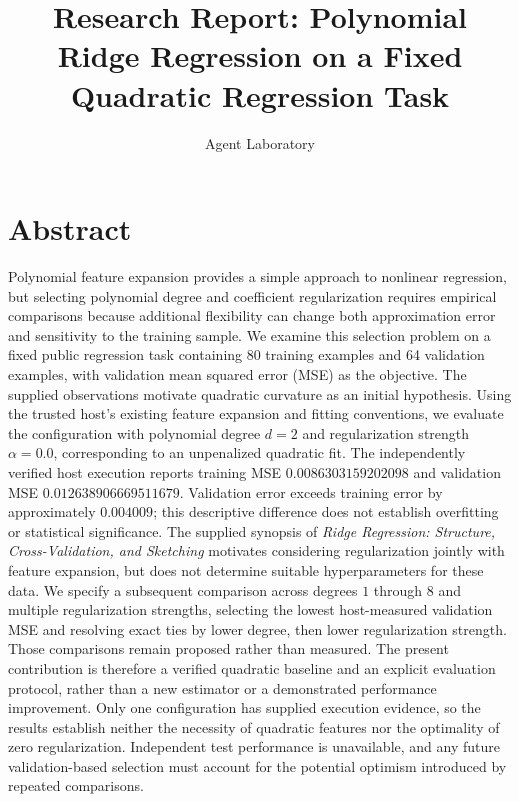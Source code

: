 \documentclass[11pt]{article}
\title{Research Report: Polynomial Ridge Regression on a Fixed Quadratic Regression Task}
\author{Agent Laboratory}
\date{}
\begin{document}
\maketitle

\section{Abstract}
Polynomial feature expansion provides a simple approach to nonlinear regression, but selecting polynomial degree and coefficient regularization requires empirical comparisons because additional flexibility can change both approximation error and sensitivity to the training sample. We examine this selection problem on a fixed public regression task containing 80 training examples and 64 validation examples, with validation mean squared error (MSE) as the objective. The supplied observations motivate quadratic curvature as an initial hypothesis. Using the trusted host's existing feature expansion and fitting conventions, we evaluate the configuration with polynomial degree \(d=2\) and regularization strength \(\alpha=0.0\), corresponding to an unpenalized quadratic fit. The independently verified host execution reports training MSE \(0.0086303159202098\) and validation MSE \(0.012638906669511679\). Validation error exceeds training error by approximately \(0.004009\); this descriptive difference does not establish overfitting or statistical significance. The supplied synopsis of \textit{Ridge Regression: Structure, Cross-Validation, and Sketching} motivates considering regularization jointly with feature expansion, but does not determine suitable hyperparameters for these data. We specify a subsequent comparison across degrees \(1\) through \(8\) and multiple regularization strengths, selecting the lowest host-measured validation MSE and resolving exact ties by lower degree, then lower regularization strength. Those comparisons remain proposed rather than measured. The present contribution is therefore a verified quadratic baseline and an explicit evaluation protocol, rather than a new estimator or a demonstrated performance improvement. Only one configuration has supplied execution evidence, so the results establish neither the necessity of quadratic features nor the optimality of zero regularization. Independent test performance is unavailable, and any future validation-based selection must account for the potential optimism introduced by repeated comparisons.
\end{document}
